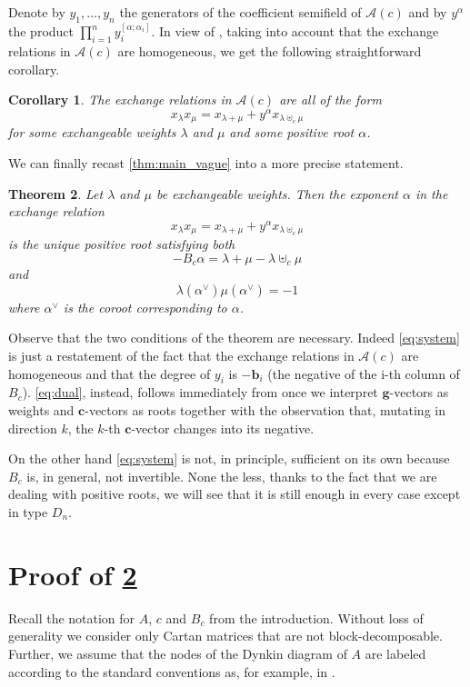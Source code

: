 \documentclass[11pt]{amsart}
\newcommand{\saySS}[1]{\say[SS]{#1}}
\newcommand{\cA}{\mathcal{A}}
\newcommand{\bg}{\mathbf{g}}
\newcommand{\bc}{\mathbf{c}}
\newcommand{\bb}{\mathbf{b}}
\newtheorem{theorem}{Theorem}[section]
\newtheorem{corollary}[theorem]{Corollary}
\numberwithin{equation}{section}
\begin{document}
  Denote by $y_1,\dots,y_n$ the generators of the coefficient semifield of $\cA(c)$ and by $y^\alpha$ the product $\prod_{i=1}^n y_i^{[\alpha;\alpha_i]}$.
  In view of \cite{NS14}, taking into account that the exchange relations in $\cA(c)$ are homogeneous, we get the following straightforward corollary.
  \begin{corollary}
    The exchange relations in $\cA(c)$ are all of the form 
    \[
      x_\lambda x_\mu = x_{\lambda+\mu} + y^\alpha x_{\lambda\uplus_c\mu}
    \]
    for some exchangeable weights $\lambda$ and $\mu$ and some positive root $\alpha$.
  \end{corollary}

  We can finally recast \cref{thm:main_vague} into a more precise statement.
  \begin{theorem}
    \label{thm:main}
    Let $\lambda$ and $\mu$ be exchangeable weights. 
    Then the exponent $\alpha$ in the exchange relation
    \[
      x_\lambda x_\mu = x_{\lambda+\mu} + y^\alpha x_{\lambda\uplus_c\mu}
    \]
    is the unique positive root satisfying both
    \saySS{Check signs here}
    \begin{equation}
      \label{eq:system}
      -B_c\alpha = \lambda+\mu-\lambda\uplus_c\mu
    \end{equation}
    and
    \begin{equation}
      \label{eq:dual}
      \lambda(\alpha^\vee) \mu(\alpha^\vee) = -1
    \end{equation}
    where $\alpha^\vee$ is the \emph{coroot} corresponding to $\alpha$.
  \end{theorem}
  Observe that the two conditions of the theorem are necessary. 
  Indeed \cref{eq:system} is just a restatement of the fact that the exchange relations in $\cA(c)$ are homogeneous and that the degree of $y_i$ is $-\bb_i$ (the negative of the i-th column of $B_c$).
  \cref{eq:dual}, instead, follows immediately from \cite[Eq. (1.11)]{NZ11} once we interpret $\bg$-vectors as weights and $\bc$-vectors as roots together with the observation that, mutating in direction $k$, the $k$-th $\bc$-vector changes into its negative.
  
  On the other hand \cref{eq:system} is not, in principle, sufficient on its own because $B_c$ is, in general, not invertible.
  None the less, thanks to the fact that we are dealing with positive roots, we will see that it is still enough in every case except in type $D_n$.
  
  
\section{Proof of \cref{thm:main}}
  Recall the notation for $A$, $c$ and $B_c$ from the introduction. 
  Without loss of generality we consider only Cartan matrices that are not block-decomposable.
  Further, we assume that the nodes of the Dynkin diagram of $A$ are labeled according to the standard conventions as, for example, in \cite[Table Fin]{Kac90}.
\end{document}
